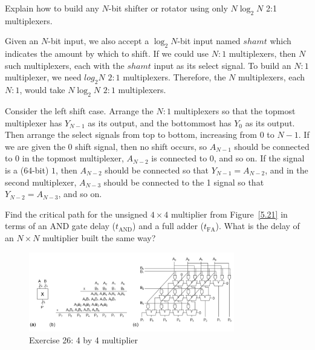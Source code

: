 \documentclass[12pt]{article}
\newenvironment{ex}[2][Exercise]{\begin{trivlist}
		\item[\hskip \labelsep {\bfseries #1}\hskip \labelsep {\bfseries #2.}]}{\end{trivlist}}
\newenvironment{sol}[1][Solution]{\begin{trivlist}
		\item[\hskip \labelsep {\bfseries #1:}]}{\end{trivlist}}
\begin{document}
\begin{ex}{5.24}
	Explain how to build any $N$-bit shifter or rotator using only $N\log_2N$ 2:1
	multiplexers.
\end{ex}

\begin{sol}
	Given an $N$-bit input, we also accept a $\log_2 N$-bit input named $shamt$
	which indicates the amount by which to shift. If we could use $N:1$ multiplexers,
	then $N$ such multiplexers, each with the $shamt$ input as its select signal.
	To build an $N:1$ multiplexer, we need $log_2N$ $2:1$ multiplexers. Therefore,
	the $N$ multiplexers, each $N:1$, would take $N\log_2N$ $2:1$ multiplexers.
	\
	
	Consider the left shift case. Arrange the $N:1$ multiplexers so that the
	topmost multiplexer has $Y_{N-1}$ as its output, and the bottommost has
	$Y_{0}$ as its output. Then arrange the select signals from top to bottom,
	increasing from 0 to $N-1$. If we are given the 0 shift signal, then
	no shift occurs, so $A_{N-1}$ should be connected to 0 in the topmost
	multiplexer, $A_{N-2}$ is connected to 0, and so on. If the signal
	is a (64-bit) $1$, then $A_{N-2}$ should be connected so that $Y_{N-1}=A_{N-2}$,
	and in the second multiplexer, $A_{N-3}$ should be connected to
	the 1 signal so that $Y_{N-2}=A_{N-3}$, and so on.
	
\end{sol}

\begin{ex}{5.26}
	Find the critical path for the unsigned $4\times 4$ multiplier from Figure~\ref{5.21}
	in terms of an AND gate delay ($t_{\text{AND}}$) and a full adder ($t_{\text{FA}}$).
	What is the delay of an $N\times N$ multiplier built the same way?
	\begin{figure}
		\centering
		\includegraphics[width=0.8\textwidth]{exercise-26-multiplication-4-by-4}
		\caption{Exercise 26: 4 by 4 multiplier}
		\label{exercise-26-multiplication-4-by-4}
	\end{figure}
\end{ex}
\end{document}
